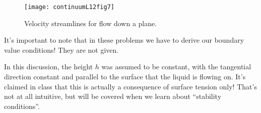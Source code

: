 \begin{figure}[htp]
   \centering
   \texttt{[image: continuumL12fig7]}
   \caption{Velocity streamlines for flow down a plane.}\label{fig:continuumL12:continuumL12fig7}
\end{figure}

It's important to note that in these problems we have to derive our boundary value conditions!  They are not given.

In this discussion, the height $h$ was assumed to be constant, with the tangential direction constant and parallel to the surface that the liquid is flowing on.  It's claimed in class that this is actually a consequence of surface tension only!  That's not at all intuitive, but will be covered when we learn about ``stability conditions''.

%
%
\EndArticle
